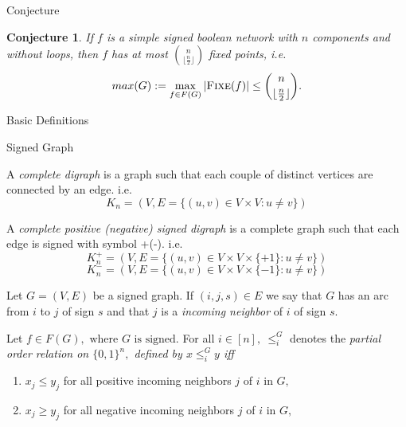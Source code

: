 \documentclass{beamer}
\newtheorem{conjecture}{Conjecture}
\newcommand{\floor}[1]{\lfloor #1 \rfloor}
\begin{document}
\begin{frame}{Conjecture}
\begin{conjecture}
If $f$ is a simple signed boolean network with $n$ components and without loops, then $f$ has at most $\binom{n}{\floor{\frac{n}{2}}}$ fixed points, i.e. 
\[
max(G) := \max_{f \in F(G)} |\text{\textsc{Fixe}}(f)| \leq \binom{n}{\floor{\frac{n}{2}}}.
\]
\end{conjecture}
\end{frame}

\begin{section}{Basic Definitions}
\begin{frame}{Signed Graph}
    \begin{definition}
    \justifying
    A \textit{complete digraph} is a graph such that each couple of distinct vertices are connected by an edge. i.e. 
    \[
        K_n = (V, E = \{ (u,v) \in V \times V : u \neq v \})
    \]
    \end{definition}
    
    \begin{definition}
    \justifying
    A \textit{complete positive (negative) signed digraph} is a complete graph such that each edge is signed with symbol +(-). i.e.
    \[ 
        K_n^+ = (V, E = \{ (u,v) \in V \times V \times \{+1\} : u \neq v \})
    \]
    \[
        K_n^- = (V, E = \{ (u,v) \in V \times V \times \{-1\} : u \neq v \})
    \]
    \end{definition}
    
\end{frame}

\begin{frame}
    \justifying
    \begin{definition}
        \justifying
        Let $G=(V,E)$ be a signed graph. If $(i,j,s) \in E$ we say that $G$ has an arc from $i$ to $j$ of sign $s$ and that $j$ is a \textit{incoming neighbor} of $i$ of sign $s.$ 
    \end{definition}
    \begin{definition}
    Let $f \in F(G), \text{ where } G \text{ is signed.}$ For all $i \in [n],\ \leq_i^G$ denotes the \it partial order relation on $\{0,1\}^n,$ defined by $x \leq_i^G y$ iff
    \begin{enumerate}
        \item $x_j \leq y_j$ for all positive incoming neighbors $j$ of $i$ in $G,$
        \item $x_j \geq y_j$ for all negative incoming neighbors $j$ of $i$ in $G,$
    \end{enumerate}
    \end{definition}
\end{frame}


\end{section}
\end{document}
